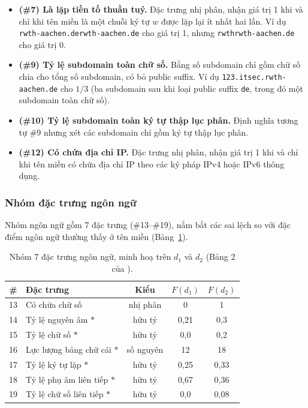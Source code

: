 \begin{itemize}
  \item \textbf{(\#7) Là lặp tiền tố thuần tuý.} Đặc trưng nhị phân, nhận giá trị 1 khi và chỉ khi tên miền là một chuỗi ký tự $w$ được lặp lại ít nhất hai lần. Ví dụ \texttt{rwth-aachen.derwth-aachen.de} cho giá trị 1, nhưng \texttt{rwthrwth-aachen.de} cho giá trị 0.
  \item \textbf{(\#9) Tỷ lệ subdomain toàn chữ số.} Bằng số subdomain chỉ gồm chữ số chia cho tổng số subdomain, có bỏ public suffix. Ví dụ \texttt{123.itsec.rwth-aachen.de} cho $1/3$ (ba subdomain sau khi loại public suffix \texttt{de}, trong đó một subdomain toàn chữ số).
  \item \textbf{(\#10) Tỷ lệ subdomain toàn ký tự thập lục phân.} Định nghĩa tương tự \#9 nhưng xét các subdomain chỉ gồm ký tự thập lục phân.
  \item \textbf{(\#12) Có chứa địa chỉ IP.} Đặc trưng nhị phân, nhận giá trị 1 khi và chỉ khi tên miền có chứa địa chỉ IP theo các ký pháp IPv4 hoặc IPv6 thông dụng.
\end{itemize}

\subsubsection{Nhóm đặc trưng ngôn ngữ}

Nhóm ngôn ngữ gồm 7 đặc trưng (\#13--\#19), nắm bắt các sai lệch so với đặc điểm ngôn ngữ thường thấy ở tên miền (Bảng~\ref{tab:ngon-ngu}).

\begin{table}[H]
\centering
\caption{Nhóm 7 đặc trưng ngôn ngữ, minh hoạ trên $d_1$ và $d_2$ (Bảng 2 của \cite{schuppen2018fanci}).}
\label{tab:ngon-ngu}
\begin{tabularx}{\textwidth}{|c|>{\raggedright\arraybackslash}X|c|c|c|}
\hline
\rowcolor{LightCyan}
\textbf{\#} & \textbf{Đặc trưng} & \textbf{Kiểu} & \textbf{$F(d_1)$} & \textbf{$F(d_2)$} \\
\hline
13 & Có chứa chữ số                            & nhị phân  & 0    & 1    \\ \hline
14 & Tỷ lệ nguyên âm $*$                       & hữu tỷ    & 0,21 & 0,3  \\ \hline
15 & Tỷ lệ chữ số $*$                          & hữu tỷ    & 0,0  & 0,2  \\ \hline
16 & Lực lượng bảng chữ cái $*$                & số nguyên & 12   & 18   \\ \hline
17 & Tỷ lệ ký tự lặp $*$                       & hữu tỷ    & 0,25 & 0,33 \\ \hline
18 & Tỷ lệ phụ âm liên tiếp $*$                & hữu tỷ    & 0,67 & 0,36 \\ \hline
19 & Tỷ lệ chữ số liên tiếp $*$                & hữu tỷ    & 0,0  & 0,08 \\ \hline
\end{tabularx}
\end{table}

